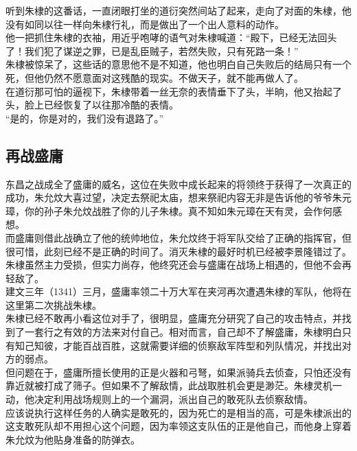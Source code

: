 \begin{multicols}{\theparacolNo}
听到朱棣的这番话，一直闭眼打坐的道衍突然间站了起来，走向了对面的朱棣，他没有如同以往一样向朱棣行礼，而是做出了一个出人意料的动作。\\

他一把抓住朱棣的衣袖，用近乎咆哮的语气对朱棣喊道：“殿下，已经无法回头了！我们犯了谋逆之罪，已是乱臣贼子，若然失败，只有死路一条！”\\

朱棣被惊呆了，这些话的意思他不是不知道，他也明白自己失败后的结局只有一个死，但他仍然不愿意面对这残酷的现实。不做天子，就不能再做人了。\\

在道衍那可怕的逼视下，朱棣带着一丝无奈的表情垂下了头，半晌，他又抬起了头，脸上已经恢复了以往那冷酷的表情。\\

“是的，你是对的，我们没有退路了。”\\

\subsection{再战盛庸}
东昌之战成全了盛庸的威名，这位在失败中成长起来的将领终于获得了一次真正的成功，朱允炆大喜过望，决定去祭祀太庙，想来祭祀内容无非是告诉他的爷爷朱元璋，你的孙子朱允炆战胜了你的儿子朱棣。真不知如朱元璋在天有灵，会作何感想。\\

而盛庸则借此战确立了他的统帅地位，朱允炆终于将军队交给了正确的指挥官，但很可惜，此刻已经不是正确的时间了。消灭朱棣的最好时机已经被李景隆错过了。朱棣虽然主力受损，但实力尚存，他终究还会与盛庸在战场上相遇的，但他不会再轻敌了。\\

建文三年（1341）三月，盛庸率领二十万大军在夹河再次遭遇朱棣的军队，他将在这里第二次挑战朱棣。\\

朱棣已经不敢再小看这位对手了，很明显，盛庸充分研究了自己的攻击特点，并找到了一套行之有效的方法来对付自己。相对而言，自己却不了解盛庸，朱棣明白只有知己知彼，才能百战百胜，这就需要详细的侦察敌军阵型和列队情况，并找出对方的弱点。\\

但问题在于，盛庸所擅长使用的正是火器和弓弩，如果派骑兵去侦查，只怕还没有靠近就被打成了筛子。但如果不了解敌情，此战取胜机会更是渺茫。朱棣灵机一动，他决定利用战场规则上的一个漏洞，派出自己的敢死队去侦察敌情。\\

应该说执行这样任务的人确实是敢死的，因为死亡的是相当的高，可是朱棣派出的这支敢死队却不用担心这个问题，因为率领这支队伍的正是他自己，而他身上穿着朱允炆为他贴身准备的防弹衣。\\


\end{multicols}
